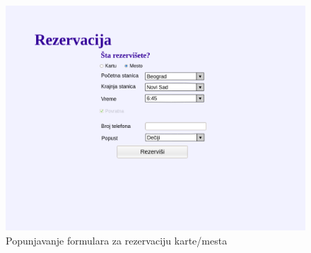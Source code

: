 \begin{description}
\begin{figure}[h!tb] 
	\centering
	\includegraphics[width=1.2\linewidth]{../Slike/Veb/rezervacija.png}
	\caption{Popunjavanje formulara za rezervaciju karte/mesta}
	\label{fig:rezervacijaformular}
\end{figure}


\end{description}


\newpage
